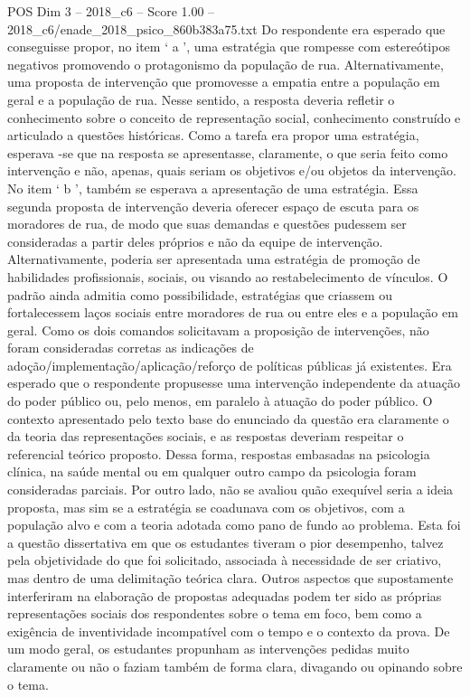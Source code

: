 \begin{textsample}{POS Dim 3 – 2018\_c6 – Score 1.00 – 2018\_c6/enade\_2018\_psico\_860b383a75.txt}
Do respondente era esperado que conseguisse propor, no item ‘ a ’, uma estratégia que rompesse com estereótipos negativos promovendo o protagonismo da população de rua.
Alternativamente, uma proposta de intervenção que promovesse a empatia entre a população em geral e a população de rua.
Nesse sentido, a resposta deveria refletir o conhecimento sobre o conceito de representação social, conhecimento construído e articulado a questões históricas.
Como a tarefa era propor uma estratégia, esperava -se que na resposta se apresentasse, claramente, o que seria feito como intervenção e não, apenas, quais seriam os objetivos e/ou objetos da intervenção.
No item ‘ b ’, também se esperava a apresentação de uma estratégia.
Essa segunda proposta de intervenção deveria oferecer espaço de escuta para os moradores de rua, de modo que suas demandas e questões pudessem ser consideradas a partir deles próprios e não da equipe de intervenção.
Alternativamente, poderia ser apresentada uma estratégia de promoção de habilidades profissionais, sociais, ou visando ao restabelecimento de vínculos.
O padrão ainda admitia como possibilidade, estratégias que criassem ou fortalecessem laços sociais entre moradores de rua ou entre eles e a população em geral.
Como os dois comandos solicitavam a proposição de intervenções, não foram consideradas corretas as indicações de adoção/implementação/aplicação/reforço de políticas públicas já existentes.
Era esperado que o respondente propusesse uma intervenção independente da atuação do poder público ou, pelo menos, em paralelo à atuação do poder público.
O contexto apresentado pelo texto base do enunciado da questão era claramente o da teoria das representações sociais, e as respostas deveriam respeitar o referencial teórico proposto.
Dessa forma, respostas embasadas na psicologia clínica, na saúde mental ou em qualquer outro campo da psicologia foram consideradas parciais.
Por outro lado, não se avaliou quão exequível seria a ideia proposta, mas sim se a estratégia se coadunava com os objetivos, com a população alvo e com a teoria adotada como pano de fundo ao problema.
Esta foi a questão dissertativa em que os estudantes tiveram o pior desempenho, talvez pela objetividade do que foi solicitado, associada à necessidade de ser criativo, mas dentro de uma delimitação teórica clara.
Outros aspectos que supostamente interferiram na elaboração de propostas adequadas podem ter sido as próprias representações sociais dos respondentes sobre o tema em foco, bem como a exigência de inventividade incompatível com o tempo e o contexto da prova.
De um modo geral, os estudantes propunham as intervenções pedidas muito claramente ou não o faziam também de forma clara, divagando ou opinando sobre o tema.

\end{textsample}
